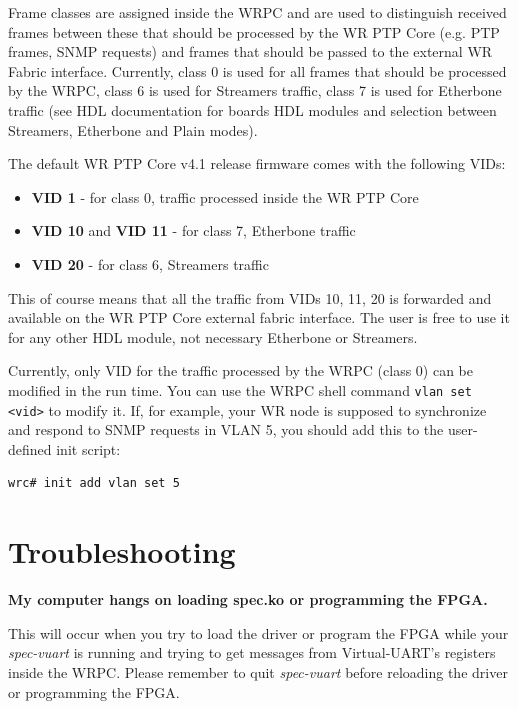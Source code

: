 \documentclass[a4paper, 12pt]{article}
\renewcommand{\_}{\underscore\allowbreak}
\begin{document}
Frame classes are assigned inside the WRPC and are used to distinguish received
frames between these that should be processed by the WR PTP Core (e.g. PTP
frames, SNMP requests) and frames that should be passed to the external WR
Fabric interface. Currently, class 0 is used for all frames that should be
processed by the WRPC, class 6 is used for Streamers traffic, class 7 is used
for Etherbone traffic (see HDL documentation for boards HDL modules and
selection between Streamers, Etherbone and Plain modes).

The default WR PTP Core v4.1 release firmware comes with the following VIDs:
\begin{itemize}
  \item \textbf{VID 1} - for class 0, traffic processed inside the WR PTP Core
  \item \textbf{VID 10} and \textbf{VID 11} - for class 7, Etherbone traffic
  \item \textbf{VID 20} - for class 6, Streamers traffic
\end{itemize}
This of course means that all the traffic from VIDs 10, 11, 20 is forwarded and
available on the WR PTP Core external fabric interface. The user is free to use
it for any other HDL module, not necessary Etherbone or Streamers.

Currently, only VID for the traffic processed by the WRPC (class 0) can be
modified in the run time. You can use the WRPC shell command
\texttt{vlan set <vid>} to modify it. If, for example, your WR node is supposed
to synchronize and respond to SNMP requests in VLAN 5, you should add this to
the user-defined init script:
\begin{lstlisting}
wrc# init add vlan set 5
\end{lstlisting}

\newpage






\newpage
\section{Troubleshooting}
\label{Troubleshooting}

\textbf{My computer hangs on loading spec.ko or programming the FPGA.}

This will occur when you try to load the driver or program the FPGA while your
\textit{spec-vuart} is running and trying to get messages from Virtual-UART's
registers inside the WRPC. Please remember to quit \textit{spec-vuart} before
reloading the driver or programming the FPGA.\\
\end{document}
